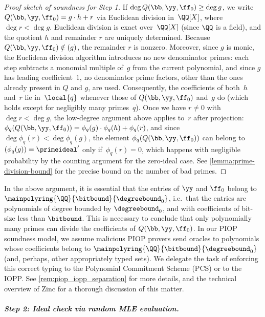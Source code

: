 \begin{proof}[Proof sketch of soundness for Step 1]
If $\deg Q(\bb,\yy,\ff_0) \geq \deg g$, we write $Q(\bb,\yy,\ff_0) = g\cdot h + r$ via Euclidean division in~$\QQ[X]$, where $\deg r < \deg g$. Euclidean division is exact over~$\QQ[X]$ (since $\QQ$ is a field), and the quotient $h$ and remainder $r$ are uniquely determined. Because $Q(\bb,\yy,\ff_0)\notin (g)$, the remainder $r$ is nonzero. Moreover, since $g$ is monic, the Euclidean division algorithm introduces no new denominator primes: each step subtracts a monomial multiple of~$g$ from the current polynomial, and since $g$ has leading coefficient~$1$, no denominator prime factors, other than the ones already present in $Q$ and $g$, are used. Consequently, the coefficients of both~$h$ and~$r$ lie in~$\local{q}$ whenever those of $Q(\bb,\yy,\ff_0)$ and~$g$ do (which holds except for negligibly many primes~$q$). Once we have $r\neq 0$ with $\deg r < \deg g$, the low-degree argument above applies to~$r$ after projection: $\phi_q(Q(\bb,\yy,\ff_0)) = \phi_q(g)\cdot\phi_q(h) + \phi_q(r)$, and since $\deg\phi_q(r) < \deg\phi_q(g)$, the element $\phi_q(Q(\bb,\yy,\ff_0))$ can belong to~$(\phi_q(g))=\primeideal'$ only if~$\phi_q(r)=0$, which happens with negligible probability by the counting argument for the zero-ideal case.  See \cref{lemma:prime-division-bound} for the precise bound on the number of bad primes.   \end{proof}

\begin{remark}\label{rem:bounded_coeffs} In the above argument, it is essential that the entries of $\yy$ and $\ff_0$ belong to $\mainpolyring{\QQ}{\bitbound}{\degreebound_0}$, i.e.\ that the entries are polynomials of degree bounded by $\degreebound_0$, and with coefficients of bit-size less than $\bitbound$. This is necessary to conclude that only polynomially many primes can divide the coefficients of $Q(\bb,\yy,\ff_0)$. In our PIOP soundness model, we assume malicious PIOP provers send oracles to polynomials whose coefficients belong to  $\mainpolyring{\QQ}{\bitbound}{\degreebound_0}$ (and, perhaps, other appropriately typed sets). We delegate the task of enforcing this correct typing  to the Polynomial Commitment Scheme (PCS) or to the IOPP. See \cref{rem:piop_iopp_separation} for more details, and the technical overview of Zinc \cite{Zinc} for a thorough discussion of this matter.
\end{remark}

\subparagraph{Step 2: Ideal check via random MLE evaluation.}

